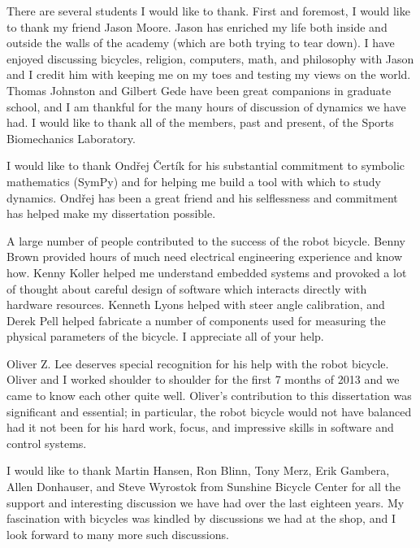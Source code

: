 There are several students I would like to thank. First and foremost, I would
like to thank my friend Jason Moore. Jason has enriched my life both inside and
outside the walls of the academy (which are both trying to tear down). I have
enjoyed discussing bicycles, religion, computers, math, and philosophy with
Jason and I credit him with keeping me on my toes and testing my views on the
world. Thomas Johnston and Gilbert Gede have been great companions in graduate
school, and I am thankful for the many hours of discussion of dynamics we have
had. I would like to thank all of the members, past and present, of the Sports
Biomechanics Laboratory.

I would like to thank Ondřej Čertík for his substantial commitment to symbolic
mathematics (SymPy) and for helping me build a tool with which to study
dynamics. Ondřej has been a great friend and his selflessness and commitment
has helped make my dissertation possible.

A large number of people contributed to the success of the robot bicycle. Benny
Brown provided hours of much need electrical engineering experience and know
how. Kenny Koller helped me understand embedded systems and provoked a lot of
thought about careful design of software which interacts directly with hardware
resources. Kenneth Lyons helped with steer angle calibration, and Derek Pell
helped fabricate a number of components used for measuring the physical
parameters of the bicycle. I appreciate all of your help.

Oliver Z. Lee deserves special recognition for his help with the robot bicycle.
Oliver and I worked shoulder to shoulder for the first 7 months of 2013 and we
came to know each other quite well. Oliver's contribution to this dissertation
was significant and essential; in particular, the robot bicycle would not have
balanced had it not been for his hard work, focus, and impressive skills in
software and control systems.

I would like to thank Martin Hansen, Ron Blinn, Tony Merz, Erik Gambera, Allen
Donhauser, and Steve Wyrostok from Sunshine Bicycle Center for all the support
and interesting discussion we have had over the last eighteen years. My
fascination with bicycles was kindled by discussions we had at the shop, and I
look forward to many more such discussions.

